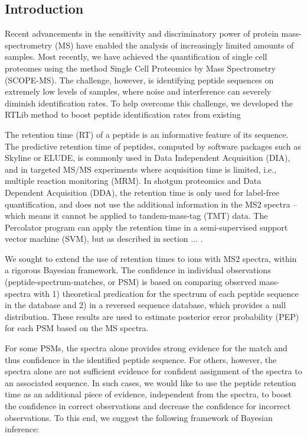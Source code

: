 \begin{spacing}{1.55} 
\vspace{1cm}

\newpage


\section{Introduction}

Recent advancements in the sensitivity and discriminatory power of protein mass-spectrometry (MS) have enabled the analysis of increasingly limited amounts of samples. Most recently, we have achieved the quantification of single cell proteomes using the method Single Cell Proteomics by Mass Spectrometry (SCOPE-MS). The challenge, however, is identifying peptide sequences on extremely low levels of samples, where noise and interference can severely diminish identification rates. To help overcome this challenge, we developed the RTLib method to boost peptide identification rates from existing  

The retention time (RT) of a peptide is an informative feature of its sequence. The predictive retention time of peptides, computed by software packages such as Skyline or ELUDE, is commonly used in Data Independent Acquisition (DIA), and in targeted MS/MS experiments where acquisition time is limited, i.e., multiple reaction monitoring (MRM). In shotgun proteomics and Data Dependent Acquisition (DDA), the retention time is only used for label-free quantification, and does not use the additional information in the MS2 spectra -- which means it cannot be applied to tandem-mass-tag (TMT) data. The Percolator program can apply the retention time in a semi-supervised support vector machine (SVM), but as described in section ... \citep{kall2007percolator}.

We sought to extend the use of retention times to ions with MS2 spectra, within a rigorous Bayesian framework. The confidence in individual observations (peptide-spectrum-matches, or PSM) is based on comparing observed mass-spectra with 1) theoretical predication for the spectrum of each peptide sequence in the database and 2) in a reversed sequence database, which provides a null distribution. These results are used to estimate posterior error probability (PEP) for each PSM based on the MS spectra. 

For some PSMs, the spectra alone provides strong evidence for the match and thus confidence in the identified peptide sequence. For others, however, the spectra alone are not sufficient evidence for confident assignment of the spectra to an associated sequence. In such cases, we would like to use the peptide retention time as an additional piece of evidence, independent from the spectra, to boost the confidence in correct observations and decrease the confidence for incorrect observations. To this end, we suggest the following framework of Bayesian inference:


\end{spacing}
